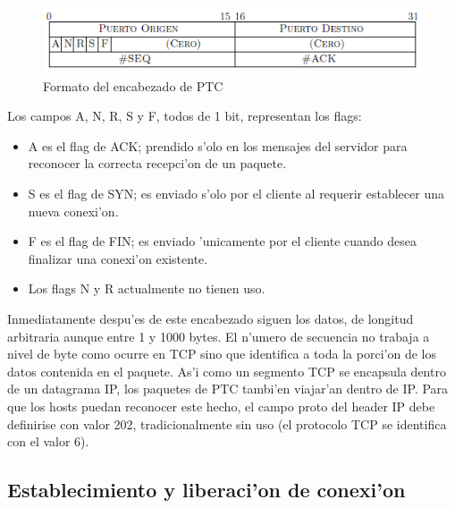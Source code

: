 \begin{figure}[H]
\begin{center}
\includegraphics[width=\textwidth,keepaspectratio]{formatosegmento.PNG}
\end{center}
\caption{Formato del encabezado de PTC} \label{figura1}
\end{figure}

Los campos A, N, R, S y F, todos de 1 bit, representan los flags:

\begin{itemize}
	\item A es el flag de ACK; prendido s'olo en los mensajes del servidor para reconocer la correcta recepci'on de un paquete.
	\item S es el flag de SYN; es enviado s'olo por el cliente al requerir establecer una nueva conexi'on.
	\item F es el flag de FIN; es enviado 'unicamente por el cliente cuando desea finalizar una conexi'on existente.
	\item Los flags N y R actualmente no tienen uso.
\end{itemize}	

Inmediatamente despu'es de este encabezado siguen los datos, de longitud arbitraria aunque entre 1 y 1000 bytes. El n'umero de secuencia no trabaja a nivel de byte como ocurre en TCP sino que identifica a toda la porci'on de los datos contenida en el paquete. As'i como un segmento TCP se encapsula dentro de un datagrama IP, los paquetes de PTC tambi'en viajar'an dentro de IP. Para que los hosts puedan reconocer este hecho, el campo proto del header IP debe definirise
con valor 202, tradicionalmente sin uso (el protocolo TCP se identifica con el valor 6). 

\subsection {Establecimiento y liberaci'on de conexi'on}


